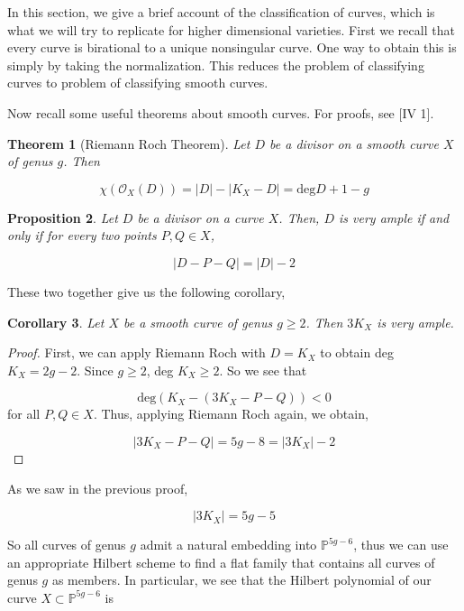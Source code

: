 \documentclass[a4paper]{article}
\newcommand{\Oc}{\mathcal{O}}
\newtheorem{theorem}{Theorem}
\newtheorem{corollary}[theorem]{Corollary}
\newtheorem{proposition}[theorem]{Proposition}
\numberwithin{theorem}{section}
\begin{document}
In this section, we give a brief account of the classification of curves, which is what we will try to replicate for higher dimensional varieties. First we recall that every curve is birational to a unique nonsingular curve. One way to obtain this is simply by taking the normalization. This reduces the problem of classifying curves to problem of classifying smooth curves.

Now recall some useful theorems about smooth curves. For proofs, see \cite{Hartshorne77}[IV 1].

\begin{theorem}[Riemann Roch Theorem]
Let $D$ be a divisor on a smooth curve $X$ of genus $g$. Then

$$ \chi(\Oc_X(D)) = |D| - |K_X-D| = \text{deg} D + 1 - g $$

\end{theorem}

\begin{proposition}\label{amplecurve}
Let $D$ be a divisor on a curve $X$. Then, $D$ is very ample if and only if for every two points $P,Q \in X$,

$$ |D-P-Q| = |D| - 2 $$

\end{proposition}


These two together give us the following corollary,

\begin{corollary}
Let $X$ be a smooth curve of genus $g \geq 2$. Then $3K_X$ is very ample.
\end{corollary}

\begin{proof}
First, we can apply Riemann Roch with $D = K_X$ to obtain deg $K_X = 2g-2$. Since $g \geq 2$, deg $K_X \geq 2$. So we see that 

$$ \text{deg} (K_X - (3K_X-P-Q)) < 0 $$for all $P,Q \in X$. Thus, applying Riemann Roch again, we obtain,

$$ |3K_X-P-Q| = 5g-8 = |3K_X| - 2 $$

\end{proof}

As we saw in the previous proof,

$$ |3K_X| = 5g - 5 $$

So all curves of genus $g$ admit a natural embedding into $\mathbb{P}^{5g-6}$, thus we can use an appropriate Hilbert scheme to find a flat family that contains all curves of genus $g$ as members. In particular, we see that the Hilbert polynomial of our curve $X \subset \mathbb{P}^{5g-6}$ is 
\end{document}

